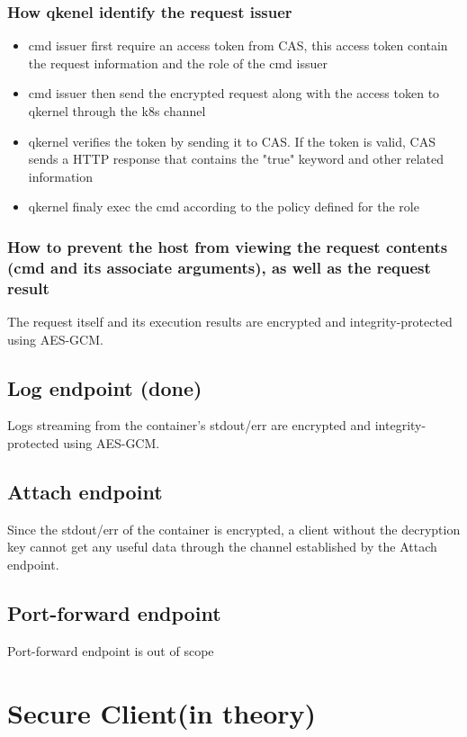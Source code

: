 \subsubsection{How qkenel identify the request issuer}
\begin{itemize}
    \item  cmd issuer first require an access token from CAS, this access token contain the request information and the role of the cmd issuer
    \item  cmd issuer then send the encrypted request along with the access token to qkernel through the k8s channel
    \item  qkernel verifies the token by sending it to CAS. If the token is valid, CAS sends a HTTP response that contains the "true" keyword and other related information
    \item  qkernel finaly exec the cmd according to the policy defined for the role
\end{itemize}
\subsubsection{How to prevent the host from viewing the request contents (cmd and its associate arguments), as well as the request result}
The request itself and its execution results are encrypted and integrity-protected using AES-GCM.

\subsection{Log endpoint (done)}
Logs streaming from the container's stdout/err are encrypted and integrity-protected using AES-GCM.
\subsection{Attach endpoint}
Since the stdout/err of the container is encrypted, a client without the decryption key cannot get any useful data through the channel established by the Attach endpoint.

\subsection{Port-forward endpoint}
Port-forward endpoint is out of scope

\section{Secure Client(in theory)}

